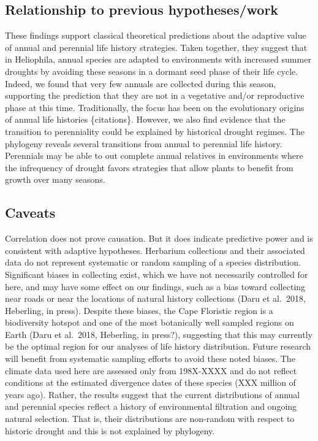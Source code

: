 \documentclass[man,floatsintext]{apa6}
\theoremstyle{definition}
\theoremstyle{definition}
\theoremstyle{definition}
\theoremstyle{remark}
\begin{document}
\hypertarget{relationship-to-previous-hypotheseswork}{%
\subsection{Relationship to previous
hypotheses/work}\label{relationship-to-previous-hypotheseswork}}

These findings support classical theoretical predictions about the
adaptive value of annual and perennial life history strategies. Taken
together, they suggest that in Heliophila, annual species are adapted to
environments with increased summer droughts by avoiding these seasons in
a dormant seed phase of their life cycle. Indeed, we found that very few
annuals are collected during this season, supporting the prediction that
they are not in a vegetative and/or reproductive phase at this time.
Traditionally, the focus has been on the evolutionary origins of annual
life histories \{citations\}. However, we also find evidence that the
transition to perenniality could be explained by historical drought
regimes. The phylogeny reveals several transitions from annual to
perennial life history. Perennials may be able to out complete annual
relatives in environments where the infrequency of drought favors
strategies that allow plants to benefit from growth over many seasons.

\hypertarget{caveats}{%
\subsection{Caveats}\label{caveats}}

Correlation does not prove causation. But it does indicate predictive
power and is consistent with adaptive hypotheses. Herbarium collections
and their associated data do not represent systematic or random sampling
of a species distribution. Significant biases in collecting exist, which
we have not necessarily controlled for here, and may have some effect on
our findings, such as a bias toward collecting near roads or near the
locations of natural history collections (Daru et al.~2018, Heberling,
in press). Despite these biases, the Cape Floristic region is a
biodiversity hotspot and one of the most botanically well sampled
regions on Earth (Daru et al.~2018, Heberling, in press?), suggesting
that this may currently be the optimal region for our analyses of life
history distribution. Future research will benefit from systematic
sampling efforts to avoid these noted biases. The climate data used here
are assessed only from 198X-XXXX and do not reflect conditions at the
estimated divergence dates of these species (XXX million of years ago).
Rather, the results suggest that the current distributions of annual and
perennial species reflect a history of environmental filtration and
ongoing natural selection. That is, their distributions are non-random
with respect to historic drought and this is not explained by phylogeny.
\end{document}
